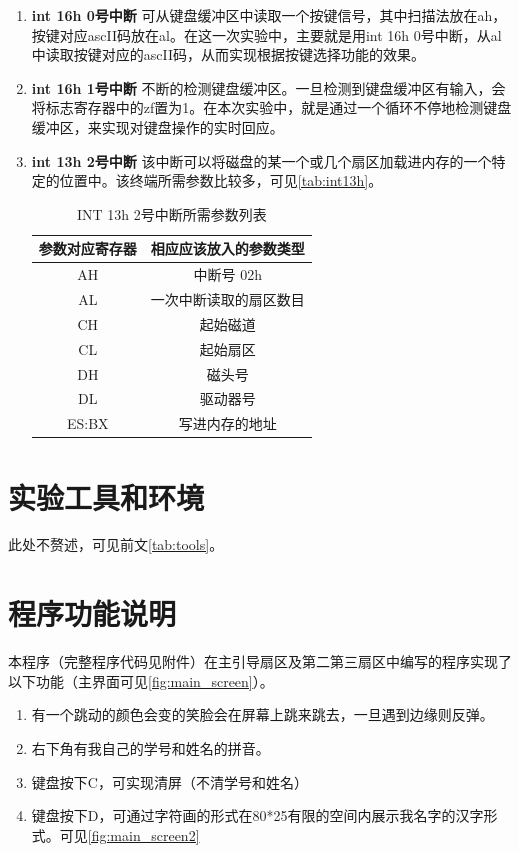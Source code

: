\documentclass[forprint]{WHUBachelor}
\begin{document}
\begin{enumerate}

  \item \textbf{int 16h 0号中断} 可从键盘缓冲区中读取一个按键信号，其中扫描法放在ah，按键对应ascII码放在al。在这一次实验中，主要就是用int 16h 0号中断，从al中读取按键对应的ascII码，从而实现根据按键选择功能的效果。

  \item \textbf{int 16h 1号中断} 不断的检测键盘缓冲区。一旦检测到键盘缓冲区有输入，会将标志寄存器中的zf置为1。在本次实验中，就是通过一个循环不停地检测键盘缓冲区，来实现对键盘操作的实时回应。

  \item \textbf{int 13h 2号中断} 该中断可以将磁盘的某一个或几个扇区加载进内存的一个特定的位置中。该终端所需参数比较多，可见\autoref{tab:int13h}。

\begin{table}[htp]
  \caption{INT 13h 2号中断所需参数列表}
  \centering
  \begin{tabular}{cc}
    \toprule
    参数对应寄存器 & 相应应该放入的参数类型 \\
    \midrule
    AH & 中断号 02h \\     
    AL & 一次中断读取的扇区数目 \\
    CH &	起始磁道 \\
    CL &	起始扇区 \\
    DH &	磁头号 \\
    DL &	驱动器号 \\
    ES:BX & 写进内存的地址 \\	    
    \bottomrule
  \end{tabular}
  \label{tab:int13h}
\end{table}


\end{enumerate}


\section{实验工具和环境}
此处不赘述，可见前文\autoref{tab:tools}。

\section{程序功能说明}

本程序（完整程序代码见附件）在主引导扇区及第二第三扇区中编写的程序实现了以下功能（主界面可见\autoref{fig:main_screen}）。

\begin{enumerate}
  \item 有一个跳动的颜色会变的笑脸会在屏幕上跳来跳去，一旦遇到边缘则反弹。
  \item 右下角有我自己的学号和姓名的拼音。
  \item 键盘按下C，可实现清屏（不清学号和姓名）
  \item 键盘按下D，可通过字符画的形式在80*25有限的空间内展示我名字的汉字形式。可见\autoref{fig:main_screen2}
\end{enumerate}
\end{document}
